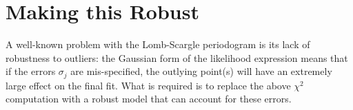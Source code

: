 \documentclass[12pt,pdftex]{article}
\begin{document}
\section{Making this Robust}
A well-known problem with the Lomb-Scargle periodogram is its lack of robustness to outliers: the Gaussian form of the likelihood expression means that if the errors $\sigma_j$ are mis-specified, the outlying point(s) will have an extremely large effect on the final fit. What is required is to replace the above $\chi^2$ computation with a robust model that can account for these errors.
\end{document}
